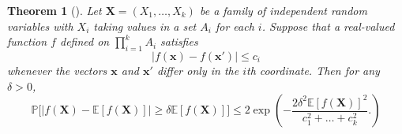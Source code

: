 \documentclass[A4paper,reqno,oneside,12pt]{amsart}
\theoremstyle{plain}
\newtheorem{theorem}{Theorem}[section]
\theoremstyle{definition}
\newcommand{\bbE}{\mathbb{E}}
\newcommand{\bbP}{\mathbb{P}}
\def\d{\delta}
\begin{document}
\begin{theorem}[{\cite[Theorem 3.1]{M}}]
\label{thm: mcdiarmid}
    Let $\mathbf{X} = (X_1, \dots, X_k)$ be a family of independent random variables with $X_i$ taking values in a set $A_i$ for each $i$.
    Suppose that a real-valued function $f$ defined on $\prod_{i=1}^k A_i$ satisfies
    \begin{equation*}
        |f(\mathbf{x}) - f(\mathbf{x}')| \leq c_i
    \end{equation*}
    whenever the vectors $\mathbf{x}$ and $\mathbf{x}'$ differ only in the $i$th coordinate.
    Then for any $\d > 0$,
    \begin{equation*}
        \bbP{\Big [} {\big |}f(\mathbf{X}) - \bbE[f(\mathbf{X})] {\big |} \geq \d \bbE[f(\mathbf{X})] {\Big ]}
        \leq 2\exp \left( - \frac{2 \d^2 \bbE [f(\mathbf{X})]^2}{c_1^2 + \dots + c_k^2}. \right)
    \end{equation*}
\end{theorem}
\end{document}
